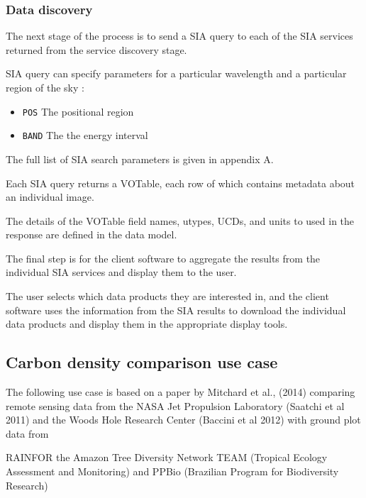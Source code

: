\documentclass{article}
\begin{document}
\subsubsection{Data discovery}

The next stage of the process is to send a SIA query to each of the SIA services
returned from the service discovery stage.

\noindent
SIA query can specify parameters for a particular wavelength and  a particular
region of the sky :
\begin{itemize}
  \item \texttt{POS}  The positional region
  \item \texttt{BAND} The the energy interval
\end{itemize}
The full list of SIA search parameters is given in appendix A.

Each SIA query returns a VOTable, each row of which contains metadata about an
individual image.

The details of the VOTable field names, utypes, UCDs, and units to used in the
response are defined in the 
data model.

The final step is for the client software to aggregate the results from the
individual SIA services and display them to the user.

The user selects which data products they are interested in, and the client
software uses the information from the SIA results to download the individual
data products and display them in the appropriate display tools.


\subsection{Carbon density comparison use case}

The following use case is based on a paper by Mitchard et al., (2014)
comparing remote sensing data from the
NASA Jet Propulsion Laboratory
(Saatchi et al 2011)
and the
Woods Hole Research Center
(Baccini et al 2012)
with 
ground plot data
from

RAINFOR
the Amazon Tree Diversity Network
TEAM (Tropical Ecology Assessment and Monitoring)
and
PPBio (Brazilian Program for Biodiversity Research)
\end{document}
